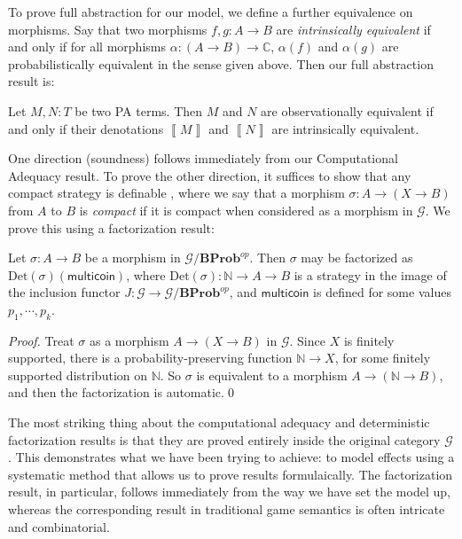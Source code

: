 \documentclass{svproc}
\newcommand{\deno}[1]{\left\llbracket#1\right\rrbracket}
\newcommand\G{\mathcal{G}}
\newcommand*\from{\colon}
\newcommand{\0}{{\mathtt{0}}} \newcommand{\com}{{\mathtt{com}}}
\newcommand{\catname}[1]{\mathbf{#1}}
\newcommand{\BProb}{\catname{BProb}}
\newcommand{\bN}{\mathbb{N}}
\newcommand{\bC}{\mathbb{C}}
\newcommand{\multicoin}{\textsf{multicoin}}
\begin{document}
To prove full abstraction for our model, we define a further equivalence on morphisms.  
Say that two morphisms $f,g\from A \to B$ are \emph{intrinsically equivalent} if and only if for all morphisms $\alpha\from (A\to B)\to\bC$, $\alpha(f)$ and $\alpha(g)$ are probabilistically equivalent in the sense given above.
Then our full abstraction result is:

\begin{proposition}
  Let $M,N\from T$ be two PA terms.  
  Then $M$ and $N$ are observationally equivalent if and only if their denotations $\deno{M}$ and $\deno{N}$ are intrinsically equivalent.
\end{proposition}

One direction (soundness) follows immediately from our Computational Adequacy result.  
To prove the other direction, it suffices to show that any compact strategy is definable \cite{CurienFullAbstraction}, where we say that a morphism $\sigma\from A \to (X \to B)$ from $A$ to $B$ is \emph{compact} if it is compact when considered as a morphism in $\G$.
We prove this using a factorization result:
\begin{lemma}
  Let $\sigma\from A \to B$ be a morphism in $\G/\BProb^{op}$.  
  Then $\sigma$ may be factorized as $\text{Det}(\sigma)(\multicoin)$, where $\text{Det}(\sigma)\from \bN \to A \to B$ is a strategy in the image of the inclusion functor $J\from \G \to \G/\BProb^{op}$, and $\multicoin$ is defined for some values $p_1,\cdots,p_k$.
\end{lemma}
\begin{proof}
  Treat $\sigma$ as a morphism $A \to (X \to B)$ in $\G$.  
  Since $X$ is finitely supported, there is a probability-preserving function $\bN \to X$, for some finitely supported distribution on $\bN$.  
  So $\sigma$ is equivalent to a morphism $A \to (\bN \to B)$, and then the factorization is automatic.\qed
\end{proof}
The most striking thing about the computational adequacy and deterministic factorization results is that they are proved entirely inside the original category $\G$.  
This demonstrates what we have been trying to achieve: to model effects using a systematic method that allows us to prove results formulaically.  
The factorization result, in particular, follows immediately from the way we have set the model up, whereas the corresponding result in traditional game semantics is often intricate and combinatorial.



\end{document}
